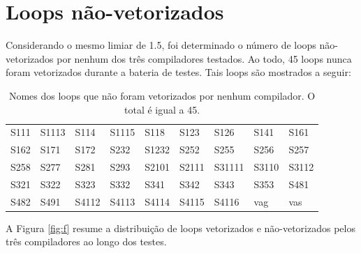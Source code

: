 \section{Loops não-vetorizados}

Considerando o mesmo limiar de 1.5, foi determinado o número de loops não-vetorizados por nenhum dos três compiladores testados. Ao todo, 45 loops nunca foram vetorizados durante a bateria de testes. Tais loops são mostrados a seguir:

\begin{table}[H]
\center
\caption{Nomes dos loops que não foram vetorizados por nenhum compilador. O total é igual a 45.} 
\begin{tabular}{@{}l l l l l l l l l@{}}
\toprule
S111 & S1113 & S114 & S1115 & S118 & S123 & S126 & S141 & S161 \\
S162 & S171 & S172 & S232 & S1232 & S252 & S255 & S256 & S257 \\
S258 & S277 & S281 & S293 & S2101 & S2111 & S31111 & S3110 & S3112 \\
S321 & S322 & S323 & S332 & S341 & S342 & S343 & S353 & S481 \\
S482 & S491 & S4112 & S4113 & S4114 & S4115 & S4116 & vag & vas \\
\bottomrule
\end{tabular}
\label{tab:f}
\end{table}

A Figura \ref{fig:f} resume a distribuição de loops vetorizados e não-vetorizados pelos três compiladores ao longo dos testes.


